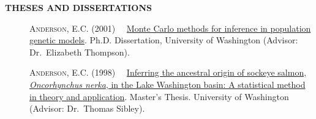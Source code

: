 \documentclass[11pt]{article}
\newlength{\postskip}
\begin{document}
\printbibheading
\bibbycategory




\vspace*{\postskip}
{\bf THESES AND DISSERTATIONS}
\begin{description}
\item[] \textsc{Anderson, E.C.} (2001) \ \ \href{http://ib.berkeley.edu/labs/slatkin/eriq/writings/ECA_Dissertation.pdf}{Monte Carlo methods for inference
in population genetic models}.  Ph.D. Dissertation, University of Washington
(Advisor: Dr.~Elizabeth Thompson).
\item[] \textsc{Anderson, E.C.} (1998) \ \ \href{http://ib.berkeley.edu/labs/slatkin/eriq/writings/eric_anderson_ms_thesis.pdf}{Inferring the ancestral origin of 
sockeye salmon, {\em Oncorhynchus nerka}, in the Lake Washington basin:
A statistical method in theory and application}. Master's Thesis. University of Washington
(Advisor: Dr.\ Thomas Sibley).
\end{description}

\vspace*{\postskip}
\end{document}
